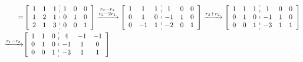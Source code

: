 \documentclass{article}
\begin{document}
\begin{jie}
\begin{align*}
[A^{-1}|E]=&
\left[
\begin{array}{c:c}
\begin{matrix}
1 & 1 & 1 \\
  1 & 2 & 1 \\
  2 & 1 & 3
\end{matrix}&
\begin{matrix}
1 & 0 & 0 \\
  0 & 1 & 0 \\
  0 & 0 & 1
\end{matrix}
\end{array}
\right]
\xrightarrow{\substack{r_{2}-r_{1}\\ r_{3}-2r_{1}}}
{
\left[
\begin{array}{c:c}
\begin{matrix}
1 & 1 & 1 \\
  0 & 1 & 0 \\
  0 & -1 & 1
\end{matrix}&
\begin{matrix}
1 & 0 & 0 \\
  -1 & 1 & 0 \\
  -2 & 0 & 1
\end{matrix}
\end{array}
\right]
}\xrightarrow{r_{3}+r_{2}}
{
\left[
\begin{array}{c:c}
\begin{matrix}
1 & 1 & 1 \\
  0 & 1 & 0 \\
  0 & 0 & 1
\end{matrix}&
\begin{matrix}
1 & 0 & 0 \\
  -1 & 1 & 0 \\
  -3 & 1 & 1
\end{matrix}
\end{array}
\right]
}\\
\xrightarrow{r_{1}-r_{3}}&
{
\left[
\begin{array}{c:c}
\begin{matrix}
1 & 1 & 0 \\
  0 & 1 & 0 \\
  0 & 0 & 1
\end{matrix}&
\begin{matrix}
4 & -1 & -1 \\
  -1 & 1 & 0 \\
  -3 & 1 & 1
\end{matrix}
\end{array}
\right]
}
\end{align*}
\end{jie}
\end{document}
